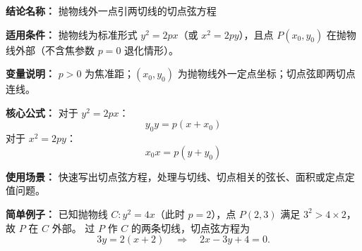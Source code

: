 \textbf{结论名称：} 抛物线外一点引两切线的切点弦方程

\textbf{适用条件：} 抛物线为标准形式 \(y^2=2px\)（或 \(x^2=2py\)），且点 \(P(x_0,y_0)\) 在抛物线外部（不含焦参数 \(p=0\) 退化情形）。

\textbf{变量说明：} \(p>0\) 为焦准距；\( (x_0,y_0) \) 为抛物线外一定点坐标；切点弦即两切点连线。

\textbf{核心公式：} 
对于 \(y^2=2px\)：
\[ \boxed{y_0y = p(x+x_0)} \]
对于 \(x^2=2py\)：
\[ \boxed{x_0x = p(y+y_0)} \]

\textbf{使用场景：} 快速写出切点弦方程，处理与切线、切点相关的弦长、面积或定点定值问题。

\textbf{简单例子：} 
已知抛物线 \(C: y^2=4x\)（此时 \(p=2\)），点 \(P(2,3)\) 满足 \(3^2 > 4\times 2\)，故 \(P\) 在 \(C\) 外部。
过 \(P\) 作 \(C\) 的两条切线，切点弦方程为
\[ 3y = 2(x+2) \quad \Longrightarrow \quad 2x - 3y + 4 = 0. \]